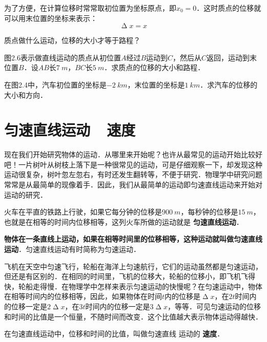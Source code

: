\begin{Project}
为了方便，在计算位移时常常取初位置为坐标原点，即$x_0=0$．这时质点的位移就可以用末位置的坐标来表示：
\begin{equation*}
    \upDelta x=x
\end{equation*}


\begin{Exercise}
	\begin{QsNum}
	    \item 质点做什么运动，位移的大小才等于路程？
	    \item 图2.6表示做直线运动的质点从初位置$A$经过$B$运动到$C$，然后从$C$返回，运动到末位置$B$．设$AB$长$\qty{7}{m}$，$BC$长$\qty{5}{m}$．求质点的位移的大小和路程．
	    \item 在图2.4中，汽车初位置的坐标是$\qty{-2}{km}$，末位置的坐标是$\qty{1}{km}$．求汽车的位移的大小和方向．
    \end{QsNum}
\end{Exercise}

\end{Project}




\section{匀速直线运动~~速度}
现在我们开始研究物体的运动．从哪里来开始呢？也许从最常见的运动开始比较好吧！一片树叶从树枝上落下是一种很常见的运动，可是仔细观察一下，却发现这种运动很复杂，树叶忽左忽右，有时还发生翻转等，不便于研究．物理学中研究问题常常是从最简单的现像着手．因此，我们从最简单的运动即匀速直线运动来开始对运动的研究．

火车在平直的铁路上行驶，如果它每分钟的位移是$\qty{900}{m}$，每秒钟的位移是$\qty{15}{m}$，也就是在相等的时间内位移相等，这列火车所做的运动就是\textbf{ 匀速直线运动}．

\textbf{ 物体在一条直线上运动，如果在相等时间里的位移相等，这种运动就叫做匀速直线运动}．匀速直线运动有时简称为匀速运动．

飞机在天空中匀速飞行，轮船在海洋上匀速航行，它们的运动虽然都是匀速运动，但还是有区别的．在相同的时间里，飞机的位移大，轮船的位移小，即飞机飞得快，轮船走得慢．在物理学中怎样来表示匀速运动的快慢呢？在匀速运动中，物体在相等时间内的位移相等，因此，如果物体在时间$t$内的位移是$\upDelta x$，在$2t$时间内的位移一定是$2\upDelta x$，在$3t$时间内的位移一定是$3\upDelta x$，等等．可见匀速运动的位移和时间的比值是一个恒量，不随时间而改变．这个比值越大表示物体运动得越快．

在匀速直线运动中，位移和时间的比值，叫做匀速直线
运动的\textbf{ 速度}．

